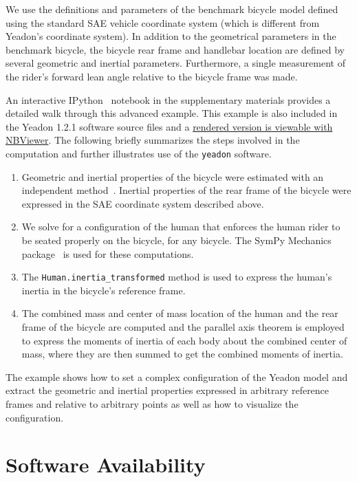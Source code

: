 \documentclass[10pt,a4paper,twocolumn]{article}
\begin{document}
We use the definitions and parameters of the benchmark bicycle model
\cite{Meijaard2007a} defined using the standard SAE vehicle coordinate system
(which is different from Yeadon's coordinate system). In addition to the
geometrical parameters in the benchmark bicycle, the bicycle rear frame and
handlebar location are defined by several geometric and inertial parameters.
Furthermore, a single measurement of the rider's forward lean angle relative to
the bicycle frame was made.

An interactive IPython~\cite{Perez2007} notebook in the supplementary materials
provides a detailed walk through this advanced example. This example is also
included in the Yeadon 1.2.1 software source files and a
\href{http://nbviewer.ipython.org/github/chrisdembia/yeadon/blob/v1.2.1/examples/bicyclerider/bicycle_example.ipynb}{rendered
  version is viewable with NBViewer}. The following briefly summarizes the
steps involved in the computation and further illustrates use of the
\verb+yeadon+ software.

\begin{enumerate}
  \item Geometric and inertial properties of the bicycle were estimated with an
    independent method~\cite{Moore2012}. Inertial properties of the rear frame
    of the bicycle were expressed in the SAE coordinate system described above.
  \item We solve for a configuration of the human that enforces the human rider
    to be seated properly on the bicycle, for any bicycle. The SymPy Mechanics
    package~\cite{Gede2013} is used for these computations.
  \item The \verb+Human.inertia_transformed+ method is used to express the
    human's inertia in the bicycle's reference frame.
  \item The combined mass and center of mass location of the human and the rear
    frame of the bicycle are computed and the parallel axis theorem is employed
    to express the moments of inertia of each body about the combined center of
    mass, where they are then summed to get the combined moments of inertia.
\end{enumerate}

The example shows how to set a complex configuration of the Yeadon model and
extract the geometric and inertial properties expressed in arbitrary reference
frames and relative to arbitrary points as well as how to visualize the
configuration.

\section*{Software Availability}
\end{document}
